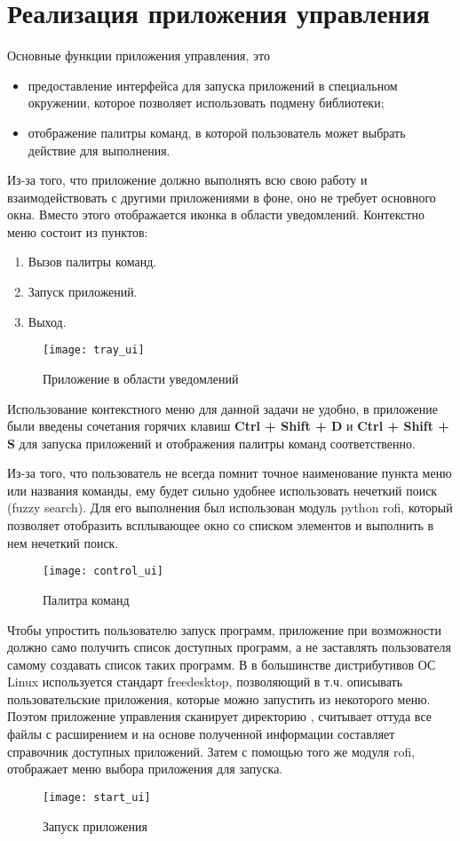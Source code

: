 \section{Реализация приложения управления}

Основные функции приложения управления, это
\begin{itemize}
    \item предоставление интерфейса для запуска приложений в специальном
    окружении, которое позволяет использовать подмену библиотеки;
    \item отображение палитры команд, в которой пользователь может выбрать
    действие для выполнения.
\end{itemize}

Из-за того, что приложение должно выполнять всю свою работу и взаимодействовать
с другими приложениями в фоне, оно не требует основного окна. Вместо этого
отображается иконка в области уведомлений. Контекстно меню состоит из пунктов:

\begin{enumerate}
    \item Вызов палитры команд.
    \item Запуск приложений.
    \item Выход.
\end{enumerate}

\begin{figure}[h]
    \centering
    \texttt{[image: tray\_ui]}
    \caption{Приложение в области уведомлений}
\end{figure}

Использование контекстного меню для данной задачи не удобно, в приложение
были введены сочетания горячих клавиш \textbf{Ctrl + Shift + D} и
\textbf{Ctrl + Shift + S} для запуска приложений и отображения палитры команд
соответственно.

Из-за того, что пользователь не всегда помнит точное наименование пункта меню
или названия команды, ему будет сильно удобнее использовать нечеткий поиск
(fuzzy search). Для его выполнения был использован модуль python rofi, который
позволяет отобразить всплывающее окно со списком элементов и выполнить в нем
нечеткий поиск.

\begin{figure}[h]
    \centering
    \texttt{[image: control\_ui]}
    \caption{Палитра команд}
\end{figure}

Чтобы упростить пользователю запуск программ, приложение при возможности должно
само получить список доступных программ, а не заставлять пользователя самому
создавать список таких программ. В в большинстве дистрибутивов ОС Linux
используется стандарт freedesktop, позволяющий в т.ч. описывать пользовательские
приложения, которые можно запустить из некоторого меню. Поэтом приложение
управления сканирует директорию , считывает оттуда
все файлы с расширением  и на основе полученной информации
составляет справочник доступных приложений. Затем с помощью того же модуля rofi,
отображает меню выбора приложения для запуска.

\begin{figure}[h]
    \centering
    \texttt{[image: start\_ui]}
    \caption{Запуск приложения}
\end{figure}

